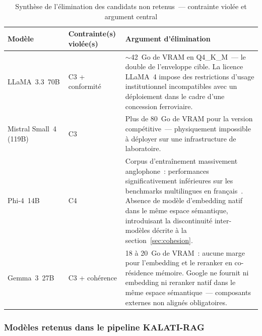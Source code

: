 \documentclass[12pt,a4paper]{report}
\begin{document}
\begin{table}
\centering
\caption{Synthèse de l'élimination des candidats non retenus~--- contrainte violée et argument
central}
\label{tab:elimination}
\small
\renewcommand{\arraystretch}{1.2}
\begin{tabularx}{\textheight}{@{} l l X @{}}
\toprule
\textbf{Modèle} & \textbf{Contrainte(s) violée(s)} & \textbf{Argument d'élimination} \\
\midrule
LLaMA~3.3~70B & C3 + conformité &
$\sim$42~Go de VRAM en Q4\_K\_M~--- le double de l'enveloppe cible. La licence LLaMA~4 impose
des restrictions d'usage institutionnel incompatibles avec un déploiement dans le cadre d'une
concession ferroviaire. \\
\addlinespace
Mistral Small~4 (119B) & C3 &
Plus de 80~Go de VRAM pour la version compétitive~--- physiquement impossible à déployer sur
une infrastructure de laboratoire. \\
\addlinespace
Phi-4~14B & C4 &
Corpus d'entraînement massivement anglophone~: performances significativement inférieures sur
les benchmarks multilingues en français~\autocite{Thellmann2024}. Absence de modèle d'embedding
natif dans le même espace sémantique, introduisant la discontinuité inter-modèles décrite à la
section~\ref{sec:cohesion}. \\
\addlinespace
Gemma~3~27B & C3 + cohérence &
18 à 20~Go de VRAM~: aucune marge pour l'embedding et le reranker en co-résidence mémoire.
Google ne fournit ni embedding ni reranker natif dans le même espace sémantique~--- composants
externes non alignés obligatoires. \\
\bottomrule
\end{tabularx}
\end{table}

\subsubsection*{Modèles retenus dans le pipeline KALATI-RAG}
\end{document}
